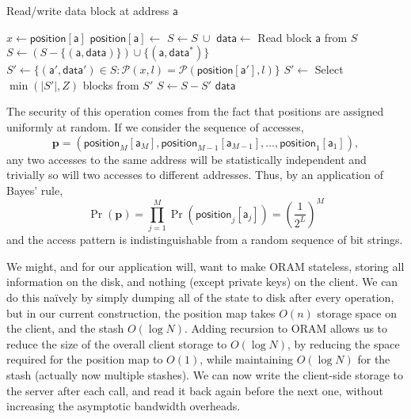 \documentclass[12pt,a4paper,twoside,openright]{report}
\begin{document}
\begin{algorithm}[h]
\caption{Read/write data block at address $\mathsf{a}$}
\label{alg:access}
\begin{algorithmic}[1]
    \vskip 10pt
    \vskip 10pt
    \State $x \gets \mathsf{position[a]}$
    \State $\mathsf{position[a]} \gets$ 
    \vskip 10pt
    	\State $S \gets S~\cup$ 
    \EndFor
    \vskip 10pt
    \State $\mathsf{data} \gets$ Read block $\mathsf{a}$ from $S$
    	\State $S \gets (S - \{(\mathsf{a,data})\}) \cup \{(\mathsf{a,data^*})\}$
    \EndIf
    \vskip 10pt
    	\State $S' \gets \{(\mathsf{a',data'}) \in S : \mathcal{P}(x,l) = \mathcal{P}(\mathsf{position[a']},l)\}$
    	\State $S' \gets$ Select $\min(|S'|,Z)$ blocks from $S'$
    	\State $S \gets S - S'$
    	\State {}
    \EndFor
    \vskip 10pt
    \State \Return $\mathsf{data}$
    \vskip 10pt
    \EndFunction
    \vskip 10pt
\end{algorithmic}
\end{algorithm}

The security of this operation comes from the fact that positions are assigned uniformly at random. If we consider the sequence of accesses, $$\mathbf{p} = (\mathsf{position}_M[\mathsf{a}_M], \mathsf{position}_{M-1}[\mathsf{a}_{M-1}], \dots, \mathsf{position}_1[\mathsf{a}_1]),$$ any two accesses to the same address will be statistically independent and trivially so will two accesses to different addresses. Thus, by an application of Bayes' rule, $$\Pr(\mathbf{p}) = \prod\limits^{M}_{j=1}\Pr(\mathsf{position}_j[\mathsf{a}_j]) = \left(\frac{1}{2^L}\right)^M$$ and the access pattern is indistinguishable from a random sequence of bit strings.

We might, and for our application will, want to make ORAM stateless, storing all information on the disk, and nothing (except private keys) on the client. We can do this na\"ively by simply dumping all of the state to disk after every operation, but in our current construction, the position map takes $O(n)$ storage space on the client, and the stash $O(\log N)$. Adding recursion to ORAM allows us to reduce the size of the overall client storage to $O(\log N)$, by reducing the space required for the position map to $O(1)$, while maintaining $O(\log N)$ for the stash (actually now multiple stashes). We can now write the client-side storage to the server after each call, and read it back again before the next one, without increasing the asymptotic bandwidth overheads.
\end{document}

